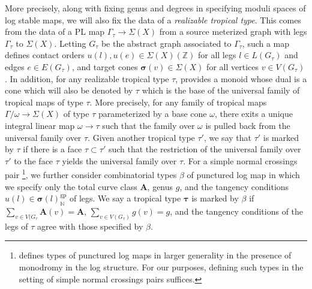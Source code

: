 \documentclass[12pt, oneside]{amsart}   	%
\newcommand{\NN}{\mathbb{N}}
\newcommand{\ZZ}{\mathbb{Z}}
\newcommand{\gp}{\operatorname{gp}}
\numberwithin{equation}{section}
\numberwithin{thm}{section}
\numberwithin{figure}{section}
\begin{document}
More precisely, along with fixing genus and degrees in specifying moduli spaces of log stable maps, we will also fix the data of a \emph{realizable tropical type}. This comes from the data of a PL map $\Gamma_{\tau} \rightarrow \Sigma(X)$ from a source meterized graph with legs $\Gamma_{\tau}$ to $\Sigma(X)$. Letting $G_{\tau}$ be the abstract graph associated to $\Gamma_{\tau}$, such a map defines contact orders $u(l),u(e) \in \Sigma(X)(\ZZ)$ for all legs $l \in L(G_{\tau})$ and edges $e \in E(G_{\tau})$, and target cones $\pmb\sigma(v) \in \Sigma(X)$ for all vertices $v \in V(G_{\tau})$. In addition, for any realizable tropical type $\tau$, \cite{punc} provides a monoid whose dual is a cone which will also be denoted by $\tau$ which is the base of the universal family of tropical maps of type $\tau$. More precisely, for any family of tropical maps $\Gamma/\omega \rightarrow \Sigma(X)$ of type $\tau$ parameterized by a base cone $\omega$, there exits a unique integral linear map $\omega \rightarrow \tau$ such that the family over $\omega$ is pulled back from the universal family over $\tau$. Given another tropical type $\tau'$, we say that $\tau'$ is marked by $\tau$ if there is a face $\tau \subset \tau'$ such that the restriction of the universal family over $\tau'$ to the face $\tau$ yields the universal family over $\tau$. For a simple normal crossings pair \footnote{\cite{punc} defines types of punctured log maps in larger generality in the presence of monodromy in the log structure. For our purposes, defining such types in the setting of simple normal crossings pairs suffices.}, we further consider combinatorial types $\beta$ of punctured log map in which we specify only the total curve class $\textbf{A}$, genus $g$, and the tangency conditions $u(l) \in \pmb\sigma(l)^{\gp}_{\NN}$ of legs. We say a tropical type $\pmb\tau$ is marked by $\beta$ if $\sum_{v \in V(G_{\tau}} \textbf{A}(v) = \textbf{A}$, $\sum_{v \in V(G_{\tau})} g(v) = g$, and the tangency conditions of the legs of $\tau$ agree with those specified by $\beta$. 
\end{document}
